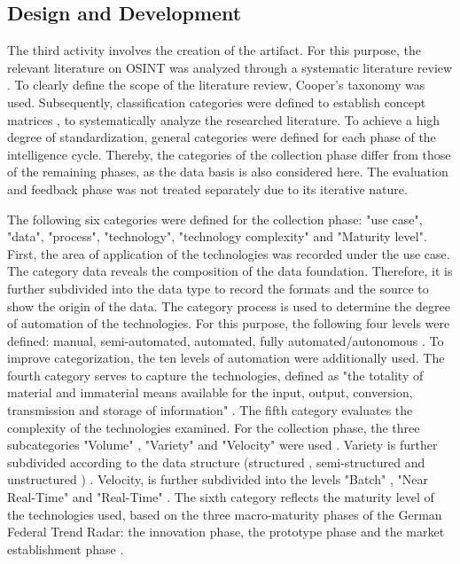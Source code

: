 \documentclass[10pt]{article}
\begin{document}
\subsection{Design and Development}

The third activity involves the creation of the artifact. For this
purpose, the relevant literature on OSINT was analyzed through a
systematic literature review \cite{Cleven.2009}. To clearly define the scope of the literature
review, Cooper's taxonomy \cite{Cooper.1988} was used. Subsequently, classification
categories were defined to establish concept matrices \cite{Webster.2002},
to systematically analyze the researched literature. To achieve a high degree of standardization,
general categories were defined for each phase of the intelligence
cycle. Thereby, the categories of the collection phase differ from
those of the remaining phases, as the data basis is also considered
here. The evaluation and feedback phase was not treated separately due
to its iterative nature.

The following six categories were defined for the collection
phase: "use case", "data", "process", "technology", "technology
complexity" and "Maturity level". First, the area of application
of the technologies was recorded under the use case. The
category data reveals the composition of the data foundation. Therefore,
it is further subdivided into the data type to record the formats and
the source to show the origin of the data. The category
process is used to determine the degree of automation of the technologies. For this purpose, the following
four levels were defined: manual, semi-automated, automated,
\cite{Duncheon.2002} fully automated/autonomous \cite{Billings.1997,Endsley.1999}.
To improve categorization, the ten levels of automation \cite{Sheridan.1978,Parasuraman.2000}
were additionally used. The fourth category serves to capture the technologies, defined
as "the totality of material and immaterial means available for
the input, output, conversion, transmission and storage of information" \cite{Bleck.2004}.
The fifth category evaluates the complexity of the technologies
examined. For the collection phase, the three subcategories
"Volume" \cite{OLeary.2012}, "Variety" and "Velocity" were used \cite{Elgendy.,Russom.2011,Singh.2012}.
Variety is further subdivided according to the data structure (structured \cite{Lin.2018},
semi-structured and unstructured \cite{Katal.2013,Praveen.2020}) \cite{OLeary.2012}. Velocity,
is further subdivided into the levels "Batch" \cite{Carbone.2015}, "Near Real-Time"
\cite{Stankovic.1990,Gomes.2021} and "Real-Time" \cite{Stankovic.1990}. The sixth category reflects the
maturity level of the technologies used, based on the three macro-maturity phases of the
German Federal Trend Radar: the innovation phase, the prototype phase and
the market establishment phase \cite{Stich.2022}.
\end{document}
